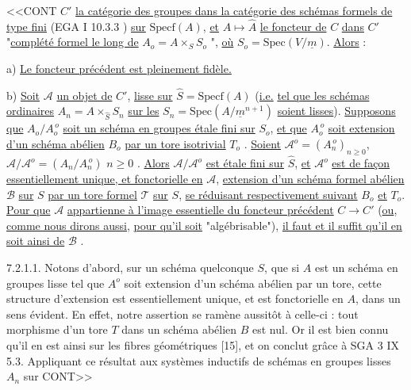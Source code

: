 
<<CONT $C'$ \underline{la catégorie des groupes dans la catégorie des schémas formels de type fini} (EGA I 10.3.3 ) \underline{sur} $\mathrm{Specf}(A)$, \underline{et} $A \longmapsto \hat{A}$ \underline{le foncteur de} $C$ \underline{dans} $C'$ "\underline{complété formel le long de} $A_o = A \times_S S_o$ ", \underline{où} $S_o = \mathrm{Spec}(V/\underline{m})$. \underline{Alors} :

a) \underline{Le foncteur précédent est pleinement fidèle.}

b) \underline{Soit} $\mathcal{A}$ \underline{un objet de} $C'$, \underline{lisse sur} $\hat{S} = \mathrm{Specf}(A)$ (\underline{i.e.} \underline{tel que les schémas ordinaires} $A_n = A \times_{\hat{S}} S_n$ \underline{sur les} $S_n = \mathrm{Spec}(A/\underline{m}^{n+1})$ \underline{soient lisses}). \underline{Supposons que} $A_o/A_o^{\,o}$ \underline{soit un schéma en groupes étale fini sur} $S_o$, \underline{et que} $A_o^{\,o}$ \underline{soit extension d'un schéma abélien} $B_o$ \underline{par un tore isotrivial} $T_o$ . \underline{Soient} $\mathcal{A}^o = (A_n^{\,o})_{n \geq 0}$, $\mathcal{A}/\mathcal{A}^o = (A_n/A_n^{\,o})$ $n \geq 0$ . \underline{Alors} $\mathcal{A}/\mathcal{A}^o$ \underline{est étale fini sur} $\hat{S}$, \underline{et} $\mathcal{A}^o$ \underline{est de façon essentiellement unique, et fonctorielle en} $\mathcal{A}$, \underline{extension d'un schéma formel abélien} $\mathcal{B}$ \underline{sur} $S$ \underline{par un tore formel} $\mathcal{T}$ \underline{sur} $S$, \underline{se réduisant respectivement suivant} $B_o$ \underline{et} $T_o$. \underline{Pour que} $\mathcal{A}$ \underline{appartienne à l'image essentielle du foncteur précédent} $C \longrightarrow C'$ (\underline{ou}, \underline{comme nous dirons aussi}, \underline{pour qu'il soit} "algébrisable"), \underline{il faut et il suffit qu'il en soit ainsi de} $\mathcal{B}$ .

7.2.1.1. Notons d'abord, sur un schéma quelconque $S$, que si $A$ est un schéma en groupes lisse tel que $A^o$ soit extension d'un schéma abélien par un tore, cette structure d'extension est essentiellement unique, et est fonctorielle en $A$, dans un sens évident. En effet, notre assertion se ramène aussitôt à celle-ci : tout morphisme d'un tore $T$ dans un schéma abélien $B$ est nul. Or il est bien connu qu'il en est ainsi sur les fibres géométriques [15], et on conclut grâce à SGA 3 IX 5.3. Appliquant ce résultat aux systèmes inductifs de schémas en groupes lisses $A_n$ sur CONT>>


